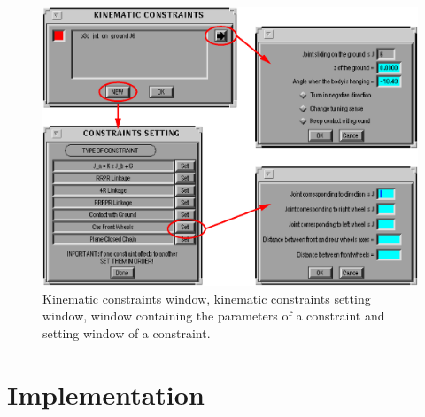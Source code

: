 \begin{figure}[h!]
\begin{center}
  \includegraphics[width=14.0cm]{FIG/Constraint/jogwins.eps}
\end{center}
\caption{\label{fig:jogwins} Kinematic constraints window, kinematic
  constraints setting window, window containing the parameters of a
  constraint and setting window of a constraint.}
\end{figure}
 

\section{Implementation}

